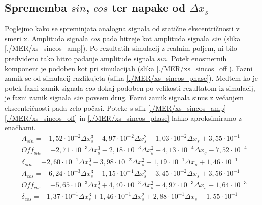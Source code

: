 


\subsection{Sprememba $sin$, $cos$ ter napake od $\Delta x_s$}

Poglejmo kako se spreminjata analogna signala od statične ekscentričnosti v smeri x. Amplituda signala $cos$ pada hitreje kot amplituda signala $sin$ (slika \ref{./MER/xs_sincos_amp}). Po rezultatih simulacij z realnim poljem, ni bilo predvideno tako hitro padanje amplitude signala $sin$. Potek enosmernih komponent je podoben kot pri simulacijah (slika \ref{./MER/xs_sincos_off}). Fazni zamik se od simulacij razlikujeta (slika \ref{./MER/xs_sincos_phase}). Medtem ko je potek fazni zamik signala $cos$ dokaj podoben po velikosti rezultatom iz simulacij, je fazni zamik signala $sin$ povsem drug. Fazni zamik signala sinus z večanjem ekscentričnosti pada zelo počasi.
Poteke s slik \ref{./MER/xs_sincos_amp} \ref{./MER/xs_sincos_off} in \ref{./MER/xs_sincos_phase} lahko aproksimiramo z enačbami. 
\begin{eqnarray}
&A_{sin} = +1,52\cdot 10^{-2}\Delta x_s^3-4,97\cdot 10^{-2}\Delta x_s^2-1,03\cdot 10^{-2}\Delta x_s+3,55\cdot 10^{-1}\\     
&Off_{sin} = +2,71\cdot 10^{-3}\Delta x_s^3-2,18\cdot 10^{-3}\Delta x_s^2+4,13\cdot 10^{-4}\Delta x_s-7,52\cdot 10^{-4}\\   
&\delta_{sin} = +2,60\cdot 10^{-1}\Delta x_s^3-3,98\cdot 10^{-2}\Delta x_s^2-1,19\cdot 10^{-1}\Delta x_s+1,46\cdot 10^{-1}\\
&A_{cos} = +6,24\cdot 10^{-3}\Delta x_s^3-1,15\cdot 10^{-1}\Delta x_s^2-3,45\cdot 10^{-2}\Delta x_s+3,56\cdot 10^{-1}\\     
&Off_{cos} = -5,65\cdot 10^{-3}\Delta x_s^3+4,40\cdot 10^{-3}\Delta x_s^2-4,97\cdot 10^{-3}\Delta x_s+1,64\cdot 10^{-3}\\   
&\delta_{cos} = -1,37\cdot 10^{-1}\Delta x_s^3+1,46\cdot 10^{-1}\Delta x_s^2+2,88\cdot 10^{-1}\Delta x_s+1,55\cdot 10^{-1}  
\end{eqnarray}

